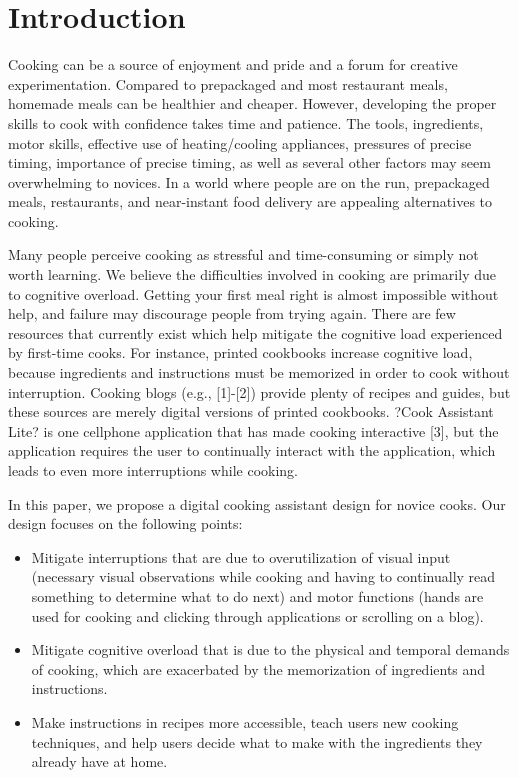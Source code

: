 \documentclass{sigchi}
\begin{document}

\section{Introduction}
Cooking can be a source of enjoyment and pride and a forum for creative experimentation. Compared to prepackaged and most restaurant meals, homemade meals can be healthier and cheaper. However, developing the proper skills to cook with confidence takes time and patience. The tools, ingredients, motor skills, effective use of heating/cooling appliances, pressures of precise timing, importance of precise timing, as well as several other factors may seem overwhelming to novices. In a world where people are on the run, prepackaged meals, restaurants, and near-instant food delivery are appealing alternatives to cooking.

Many people perceive cooking as stressful and time-consuming or simply not worth learning. We believe the difficulties involved in cooking are primarily due to cognitive overload. Getting your first meal right is almost impossible without help, and failure may discourage people from trying again. There are few resources that currently exist which help mitigate the cognitive load experienced by first-time cooks. For instance, printed cookbooks increase cognitive load, because ingredients and instructions must be memorized in order to cook without interruption. Cooking blogs (e.g., [1]-[2]) provide plenty of recipes and guides, but these sources are merely digital versions of printed cookbooks. ?Cook Assistant Lite? is one cellphone application that has made cooking interactive [3], but the application requires the user to continually interact with the application, which leads to even more interruptions while cooking.

In this paper, we propose a digital cooking assistant design for novice cooks. Our design focuses on the following points:
\begin{itemize}
\item	Mitigate interruptions that are due to overutilization of visual input (necessary visual observations while cooking and having to continually read something to determine what to do next) and motor functions (hands are used for cooking and clicking through applications or scrolling on a blog).
\item Mitigate cognitive overload that is due to the physical and temporal demands of cooking, which are exacerbated by the memorization of ingredients and instructions.
\item Make instructions in recipes more accessible, teach users new cooking techniques, and help users decide what to make with the ingredients they already have at home.
\end{itemize}
\end{document}
